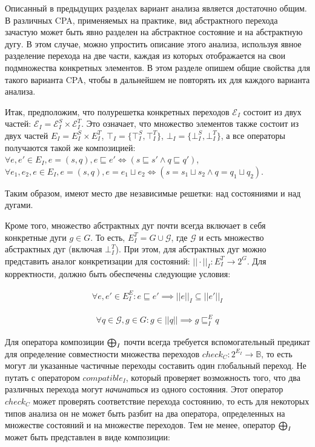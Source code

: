 Описанный в предыдущих разделах вариант анализа является достаточно общим. 
В различных CPA, применяемых на практике, вид абстрактного перехода зачастую может быть явно разделен на абстрактное состояние и на абстрактную дугу.
В этом случае, можно упростить описание этого анализа, используя явное разделение перехода на две части, каждая из которых отображается на свои подмножества конкретных элементов.
В этом разделе опишем общие свойства для такого варианта CPA, чтобы в дальнейшем не повторять их для каждого варианта анализа.

Итак, предположим, что полурешетка конкретных переходов $\mathcal{E}_I$ состоит из двух частей: $\mathcal{E}_I = \mathcal{E}^S_I \times \mathcal{E}^T_I$.
Это означает, что множество элементов также состоит из двух частей $E_I = E^S_I \times E^T_I$, $\top_I = \{\top^S_I, \top^T_I\}$, $\bot_I = \{\bot^S_I, \bot^T_I\}$, а все операторы получаются такой же композицией:\\
$\forall e, e' \in E_I, e = (s, q), e \sqsubseteq e' \iff (s \sqsubseteq s' \land q \sqsubseteq q')$, \\
$\forall e_1, e_2, e \in E_I, e = (s, q), e = e_1 \sqcup e_2 \iff (s = s_1 \sqcup s_2 \land q = q_1 \sqcup q_2)$.

Таким образом, имеют место две независимые решетки: над состояниями и над дугами.

Кроме того, множество абстрактных дуг почти всегда включает в себя конкретные дуги $g \in G$. 
То есть, $E^T_I = G \cup \mathcal{G}$, где $\mathcal{G}$ и есть множество абстрактных дуг (включая $\bot^T_I$).
При этом, для абстрактных дуг можно представить аналог конкретизации для состояний: $||\cdot||_I : E^T_I \to 2^G$.
Для корректности, должно быть обеспечены следующие условия:

\begin{equation}
\label{conc_edge_eq_1}
\begin{aligned}
\forall e, e' \in E^E_I: e \sqsubseteq e' \implies ||e||_I \subseteq ||e'||_I
\end{aligned}
\end{equation}

\begin{equation}
\label{conc_edge_eq_2}
\begin{aligned}
\forall q \in \mathcal{G}, g \in G: g \in ||q|| \implies g \sqsubseteq^E_I q
\end{aligned}
\end{equation}


Для оператора композиции $\mathrel{\bigoplus}_I$ почти всегда требуется вспомогательный предикат для определение совместности множества переходов $check_C: 2^{E_I} \to \mathbb{B}$, то есть могут ли указанные частичные переходы составить один глобальный переход.
Не путать с оператором $compatible_I$, который проверяет возможность того, что два различных перехода могут \textit{начинаться} из одного состояния.
Этот оператор $check_C$ может проверять соответствие перехода состоянию, то есть для некоторых типов анализа он не может быть разбит на два оператора, определенных на множестве состояний и на множестве переходов.
Тем не менее, оператор $\mathrel{\bigoplus}_I$ может быть представлен в виде композиции:

